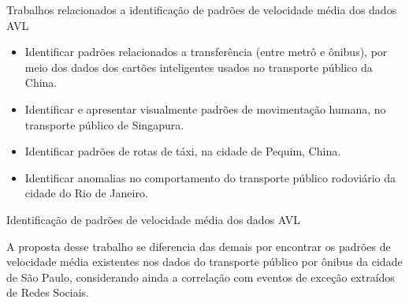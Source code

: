 \documentclass{beamer}
\begin{document}
\begin{frame}{Trabalhos relacionados a identificação de padrões de velocidade média dos dados AVL}
\begin{itemize}
    \item Identificar \alert{padrões relacionados a transferência (entre metrô e ônibus)}, por meio dos dados dos cartões inteligentes usados no transporte público da China.
    \item Identificar e apresentar visualmente \alert{padrões de movimentação humana}, no transporte público de Singapura. 
    \item Identificar \alert{padrões de rotas de táxi}, na cidade de Pequim, China.
    \item Identificar \alert{anomalias no comportamento do transporte público rodoviário da cidade do Rio de Janeiro}.
\end{itemize}
\end{frame}
\begin{frame}{Identificação de padrões de velocidade média dos dados AVL}
\begin{block}{}
        A proposta desse trabalho se diferencia das demais por encontrar os padrões de velocidade média existentes nos dados do transporte público por ônibus da cidade de São Paulo, considerando ainda a correlação com eventos de exceção extraídos de Redes Sociais.
\end{block}
\end{frame}
\end{document}
